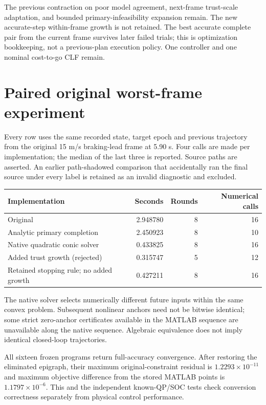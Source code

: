\documentclass[11pt]{article}
\begin{document}
The previous contraction on poor model agreement, next-frame trust-scale
adaptation, and bounded primary-infeasibility expansion remain. The new
accurate-step within-frame growth is not retained. The best accurate complete
pair from the current frame survives later failed trials; this is optimization
bookkeeping, not a previous-plan execution policy. One controller and one
nominal cost-to-go CLF remain.

\section{Paired original worst-frame experiment}
Every row uses the same recorded state, target epoch and previous trajectory
from the original 15 m/s braking-lead frame at 5.90 s. Four calls are made per
implementation; the median of the last three is reported. Source paths are
asserted. An earlier path-shadowed comparison that accidentally ran the final
source under every label is retained as an invalid diagnostic and excluded.
\begin{center}\small\begin{tabular}{lrrr}\toprule
Implementation & Seconds & Rounds & Numerical calls\\\midrule
Original & 2.948780 & 8 & 16\\
Analytic primary completion & 2.450923 & 8 & 10\\
Native quadratic conic solver & 0.433825 & 8 & 16\\
Added trust growth (rejected) & 0.315747 & 5 & 12\\
Retained stopping rule; no added growth & 0.427211 & 8 & 16\\
\bottomrule\end{tabular}\end{center}
The native solver selects numerically different future inputs within the same
convex problem. Subsequent nonlinear anchors need not be bitwise identical;
some strict zero-anchor certificates available in the MATLAB sequence are
unavailable along the native sequence. Algebraic equivalence does not imply
identical closed-loop trajectories.

All sixteen frozen programs return full-accuracy convergence. After restoring
the eliminated epigraph, their maximum original-constraint residual is
$1.2293\times10^{-11}$ and maximum objective difference from the stored MATLAB
points is $1.1797\times10^{-6}$. This and the independent known-QP/SOC tests
check conversion correctness separately from physical control performance.
\end{document}
